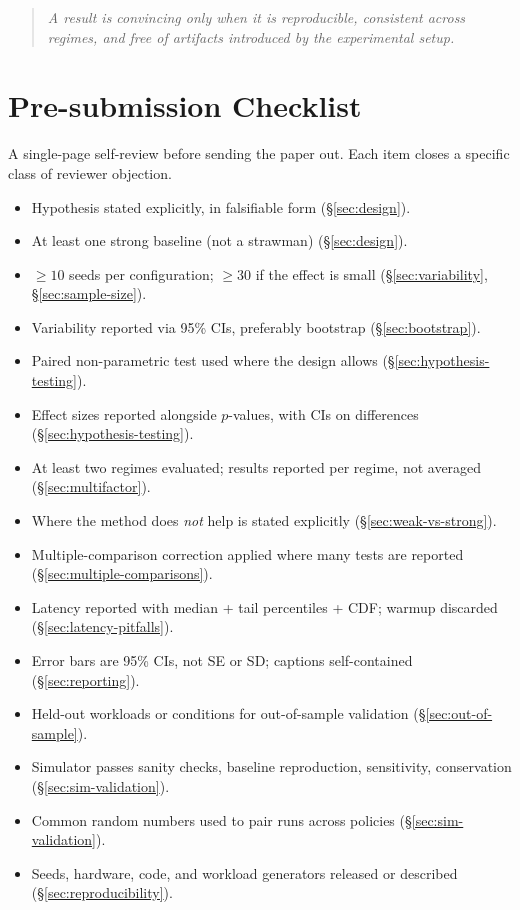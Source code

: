 \documentclass[11pt]{article}
\begin{document}
\begin{quote}
\emph{A result is convincing only when it is reproducible, consistent across regimes, and free of artifacts introduced by the experimental setup.}
\end{quote}

\appendix

\section{Pre-submission Checklist}
\label{sec:checklist}

A single-page self-review before sending the paper out. Each item closes a specific class of reviewer objection.

\begin{itemize}[leftmargin=*, itemsep=2pt]
    \item[$\Box$] Hypothesis stated explicitly, in falsifiable form (\S\ref{sec:design}).
    \item[$\Box$] At least one strong baseline (not a strawman) (\S\ref{sec:design}).
    \item[$\Box$] $\geq 10$ seeds per configuration; $\geq 30$ if the effect is small (\S\ref{sec:variability}, \S\ref{sec:sample-size}).
    \item[$\Box$] Variability reported via 95\% CIs, preferably bootstrap (\S\ref{sec:bootstrap}).
    \item[$\Box$] Paired non-parametric test used where the design allows (\S\ref{sec:hypothesis-testing}).
    \item[$\Box$] Effect sizes reported alongside $p$-values, with CIs on differences (\S\ref{sec:hypothesis-testing}).
    \item[$\Box$] At least two regimes evaluated; results reported per regime, not averaged (\S\ref{sec:multifactor}).
    \item[$\Box$] Where the method does \emph{not} help is stated explicitly (\S\ref{sec:weak-vs-strong}).
    \item[$\Box$] Multiple-comparison correction applied where many tests are reported (\S\ref{sec:multiple-comparisons}).
    \item[$\Box$] Latency reported with median + tail percentiles + CDF; warmup discarded (\S\ref{sec:latency-pitfalls}).
    \item[$\Box$] Error bars are 95\% CIs, not SE or SD; captions self-contained (\S\ref{sec:reporting}).
    \item[$\Box$] Held-out workloads or conditions for out-of-sample validation (\S\ref{sec:out-of-sample}).
    \item[$\Box$] Simulator passes sanity checks, baseline reproduction, sensitivity, conservation (\S\ref{sec:sim-validation}).
    \item[$\Box$] Common random numbers used to pair runs across policies (\S\ref{sec:sim-validation}).
    \item[$\Box$] Seeds, hardware, code, and workload generators released or described (\S\ref{sec:reproducibility}).
\end{itemize}
\end{document}
